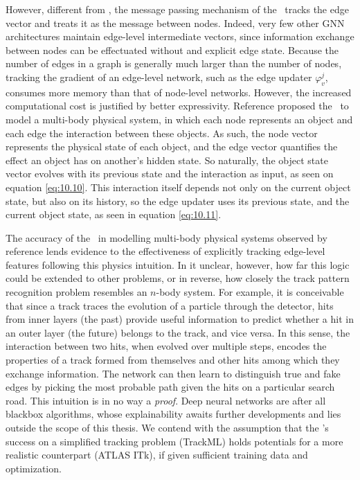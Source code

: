 However, different from \graphsage, the message passing mechanism of the \ignn~tracks the edge vector and treats it as the message between nodes.
Indeed, very few other GNN architectures maintain edge-level intermediate vectors, since information exchange between nodes can be effectuated without and explicit edge state. 
Because the number of edges in a graph is generally much larger than the number of nodes, tracking the gradient of an edge-level network, such as the edge updater $\varphi_v^j$, consumes more memory than that of node-level networks.
However, the increased computational cost is justified by better expressivity. 
Reference \cite{interaction-gnn} proposed the \ignn~to model a multi-body physical system, in which each node represents an object and each edge the interaction between these objects. 
As such, the node vector represents the physical state of each object, and the edge vector quantifies the effect an object has on another's hidden state. 
So naturally, the object state vector evolves with its previous state and the interaction as input, as seen on equation \eqref{eq:10.10}.
This interaction itself depends not only on the current object state, but also on its history, so the edge updater uses its previous state, and the current object state, as seen in equation \eqref{eq:10.11}.

The accuracy of the \ignn~in modelling multi-body physical systems observed by reference \cite{interaction-gnn} lends evidence to the effectiveness of explicitly tracking edge-level features following this physics intuition.
In it unclear, however, how far this logic could be extended to other problems, or in reverse, how closely the track pattern recognition problem resembles an $n$-body system. 
For example, it is conceivable that since a track traces the evolution of a particle through the detector, hits from inner layers (the past) provide useful information to predict whether a hit in an outer layer (the future) belongs to the track, and vice versa. 
In this sense, the interaction between two hits, when evolved over multiple steps, encodes the properties of a track formed from themselves and other hits among which they exchange information. 
The network can then learn to distinguish true and fake edges by picking the most probable path given the hits on a particular search road.
This intuition is in no way a \textit{proof}. 
Deep neural networks are after all blackbox algorithms, whose explainability awaits further developments and lies outside the scope of this thesis.
We contend with the assumption that the \ignn's success on a simplified tracking problem (TrackML) \cite{exatrkx} holds potentials for a more realistic counterpart (ATLAS ITk), if given sufficient training data and optimization. 

